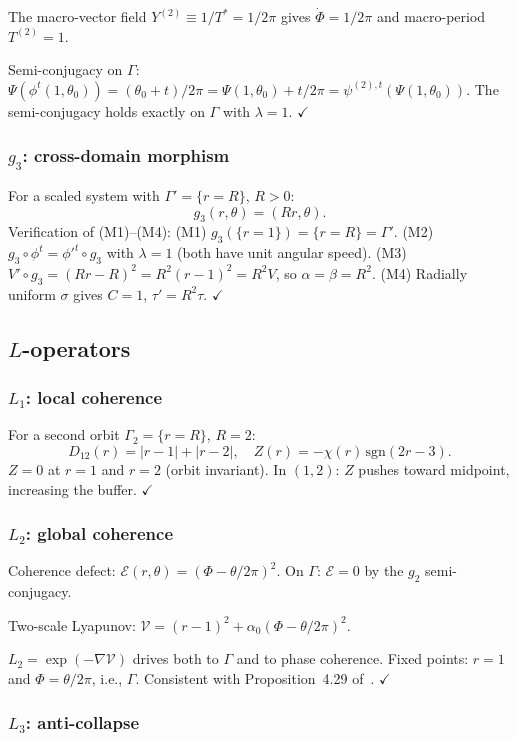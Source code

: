 \documentclass[12pt, oneside]{book}
\theoremstyle{plain}
\theoremstyle{definition}
\theoremstyle{remark}
\newcommand{\Orb}{\Gamma}
\newcommand{\abs}[1]{\left|#1\right|}
\begin{document}
The macro-vector field $Y^{(2)}\equiv 1/T^*=1/2\pi$ gives
$\dot\Phi=1/2\pi$ and macro-period $T^{(2)}=1$.

Semi-conjugacy on $\Orb$: $\Psi(\phi^t(1,\theta_0))=(\theta_0+t)/2\pi
=\Psi(1,\theta_0)+t/2\pi=\psi^{(2),t}(\Psi(1,\theta_0))$.
The semi-conjugacy holds exactly on $\Orb$ with $\lambda=1$. $\checkmark$

\subsubsection{$g_3$: cross-domain morphism}

For a scaled system with $\Orb'=\{r=R\}$, $R>0$:
\[
  g_3(r,\theta) = (Rr,\theta).
\]
Verification of (M1)--(M4):
(M1) $g_3(\{r=1\})=\{r=R\}=\Orb'$.
(M2) $g_3\circ\phi^t=\phi'^t\circ g_3$ with $\lambda=1$ (both
     have unit angular speed).
(M3) $V'\circ g_3=(Rr-R)^2=R^2(r-1)^2=R^2 V$, so $\alpha=\beta=R^2$.
(M4) Radially uniform $\sigma$ gives $C=1$, $\tau'=R^2\tau$. $\checkmark$

\subsection{\texorpdfstring{$L$}{L}-operators}

\subsubsection{$L_1$: local coherence}

For a second orbit $\Orb_2=\{r=R\}$, $R=2$:
\[
  D_{12}(r) = \abs{r-1} + \abs{r-2},\quad
  Z(r) = -\chi(r)\,\mathrm{sgn}(2r-3).
\]
$Z=0$ at $r=1$ and $r=2$ (orbit invariant). In $(1,2)$: $Z$
pushes toward midpoint, increasing the buffer. $\checkmark$

\subsubsection{$L_2$: global coherence}

Coherence defect: $\mathcal{E}(r,\theta)=(\Phi-\theta/2\pi)^2$.
On $\Orb$: $\mathcal{E}=0$ by the $g_2$ semi-conjugacy.

Two-scale Lyapunov: $\mathcal{V}=(r-1)^2+\alpha_0(\Phi-\theta/2\pi)^2$.

$L_2=\exp(-\nabla\mathcal{V})$ drives both to $\Orb$ and to phase
coherence. Fixed points: $r=1$ and $\Phi=\theta/2\pi$, i.e., $\Orb$.
Consistent with Proposition~4.29 of~\cite{Paper1}. $\checkmark$

\subsubsection{$L_3$: anti-collapse}
\end{document}
